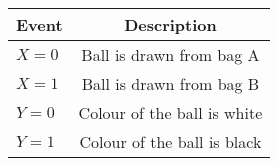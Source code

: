\begin{tabular}{|l|c|}

\hline
\textbf{Event} & \textbf{Description} \\
\hline
$X = 0$ &  Ball is drawn from bag A \\
\hline
$X = 1$ &  Ball is drawn from bag B  \\
\hline
$Y = 0$ &  Colour of the ball is white \\
\hline
$Y = 1$ &  Colour of the ball is black\\
\hline
\end{tabular}
